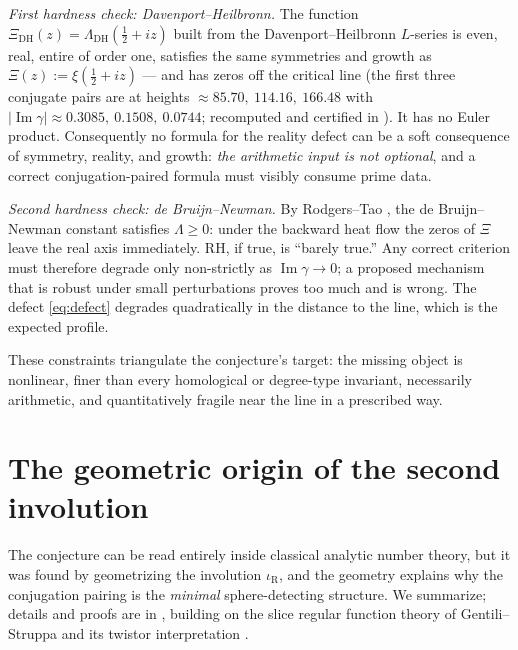 \documentclass[11pt]{amsart}
\theoremstyle{definition}
\theoremstyle{remark}
\DeclareMathOperator{\Iim}{Im}
\begin{document}
\emph{First hardness check: Davenport--Heilbronn.} The function $\Xi_{\mathrm{DH}}(z)=\Lambda_{\mathrm{DH}}(\tfrac12+iz)$ built from the Davenport--Heilbronn $L$-series \cite{DavenportHeilbronn,TitchmarshBook} is even, real, entire of order one, satisfies the same symmetries and growth as $\Xi(z):=\xi(\tfrac12+iz)$ --- and has zeros off the critical line (the first three conjugate pairs are at heights $\approx85.70,\ 114.16,\ 166.48$ with $|\!\Iim\gamma|\approx 0.3085,\ 0.1508,\ 0.0744$; recomputed and certified in \cite{ZS}). It has no Euler product. Consequently no formula for the reality defect can be a soft consequence of symmetry, reality, and growth: \emph{the arithmetic input is not optional}, and a correct conjugation-paired formula must visibly consume prime data.

\emph{Second hardness check: de Bruijn--Newman.} By Rodgers--Tao \cite{RodgersTao}, the de Bruijn--Newman constant satisfies $\Lambda\ge0$: under the backward heat flow the zeros of $\Xi$ leave the real axis immediately. RH, if true, is ``barely true.'' Any correct criterion must therefore degrade only non-strictly as $\Iim\gamma\to0$; a proposed mechanism that is robust under small perturbations proves too much and is wrong. The defect \eqref{eq:defect} degrades quadratically in the distance to the line, which is the expected profile.

These constraints triangulate the conjecture's target: the missing object is nonlinear, finer than every homological or degree-type invariant, necessarily arithmetic, and quantitatively fragile near the line in a prescribed way.

\section{The geometric origin of the second involution}\label{sec:geom}

The conjecture can be read entirely inside classical analytic number theory, but it was found by geometrizing the involution $\iota_{\mathrm{R}}$, and the geometry explains why the conjugation pairing is the \emph{minimal} sphere-detecting structure. We summarize; details and proofs are in \cite{ZS}, building on the slice regular function theory of Gentili--Struppa \cite{GentiliStruppa} and its twistor interpretation \cite{GentiliSalamonStoppato,AltavillaSarfatti}.
\end{document}
